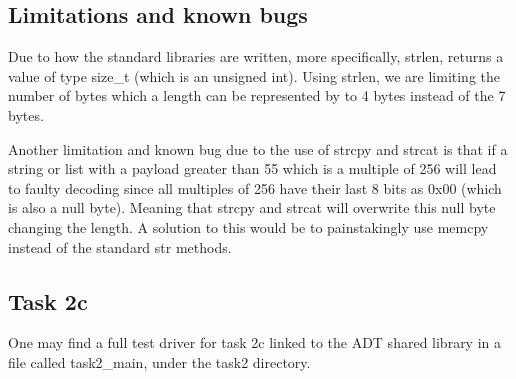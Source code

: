 \documentclass[a4paper, 12pt, titlepage]{article}
\begin{document}
\begin{onehalfspacing}
   \subsection{Limitations and known bugs}
   Due to how the standard libraries are written, more specifically, strlen, returns a value of type size\_t (which is an unsigned int). Using strlen, we are limiting the number of bytes which a length can be represented by to 4 bytes instead of the 7 bytes.

   Another limitation and known bug due to the use of strcpy and strcat is that if a string or list with a payload greater than 55 which is a multiple of 256 will lead to faulty decoding since all multiples of 256 have their last 8 bits as 0x00 (which is also a null byte). Meaning that strcpy and strcat will overwrite this null byte changing the length. A solution to this would be to painstakingly use memcpy instead of the standard str methods.

   \subsection{Task 2c}
   One may find a full test driver for task 2c linked to the ADT shared library in a file called task2\_main, under the task2 directory.



\end{onehalfspacing}
\end{document}
